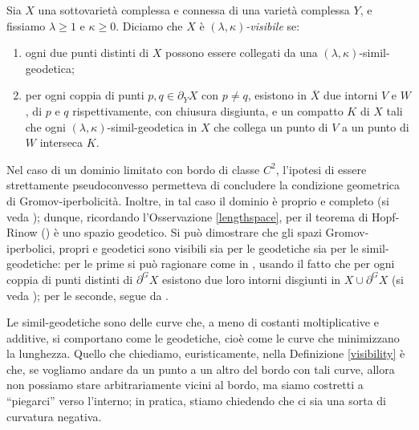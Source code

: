 \begin{defn} \label{visibility}
    Sia $X$ una sottovarietà complessa e connessa di una varietà complessa $Y$, e fissiamo $\lambda \ge 1$ e $\kappa \ge 0$. Diciamo che $X$ è \textit{$(\lambda,\kappa)$-visibile} se:
    \begin{enumerate}
        \item ogni due punti distinti di $X$ possono essere collegati da una $(\lambda,\kappa)$-simil-geodetica;
        \item per ogni coppia di punti $p,q\in\partial_YX$ con $p\not=q$, esistono in $\overline{X}$ due intorni $V$ e $W$, di $p$ e $q$ rispettivamente, con chiusura disgiunta, e un compatto $K$ di $X$ tali che  ogni $(\lambda,\kappa)$-simil-geodetica in $X$ che collega un punto di $V$ a un punto di $W$ interseca $K$.
    \end{enumerate}
\end{defn}

\begin{oss} \label{spscvxisvis}
    Nel caso di un dominio limitato con bordo di classe $C^2$, l'ipotesi di essere strettamente pseudoconvesso permetteva di concludere la condizione geometrica di Gromov-iperbolicità. Inoltre, in tal caso il dominio è proprio e completo (si veda \cite[Paragraph 3.3]{G}); dunque, ricordando l'Osservazione \ref{lengthspace}, per il teorema di Hopf-Rinow (\cite[Part I, Proposition 3.7]{BH}) è uno spazio geodetico. Si può dimostrare che gli spazi Gromov-iperbolici, propri e geodetici sono visibili sia per le geodetiche sia per le simil-geodetiche: per le prime si può ragionare come in \cite[Proposition 2.5]{BNT}, usando il fatto che per ogni coppia di punti distinti di $\partial^G X$ esistono due loro intorni disgiunti in $X\cup\partial^GX$ (si veda \cite[Part III, Chapter H, Lemma 3.6]{BH}); per le seconde, segue da \cite[Part III, Chapter H, Theorem 1.7]{BH}.
\end{oss}

Le simil-geodetiche sono delle curve che, a meno di costanti moltiplicative e additive, si comportano come le geodetiche, cioè come le curve che minimizzano la lunghezza.
Quello che chiediamo, euristicamente, nella Definizione \ref{visibility} è che, se vogliamo andare da un punto a un altro del bordo con tali curve, allora non possiamo stare arbitrariamente vicini al bordo, ma siamo costretti a ``piegarci'' verso l'interno; in pratica, stiamo chiedendo che ci sia una sorta di curvatura negativa.

